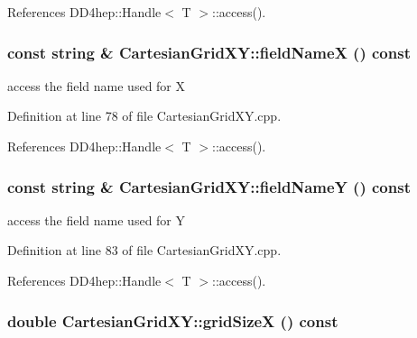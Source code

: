 References DD4hep::Handle$<$ T $>$::access().\hypertarget{class_d_d4hep_1_1_geometry_1_1_cartesian_grid_x_y_aa112adb69e3956f7a576f0de3267b499}{
\subsubsection[{fieldNameX}]{\setlength{\rightskip}{0pt plus 5cm}const {\bf string} \& CartesianGridXY::fieldNameX () const}}
\label{class_d_d4hep_1_1_geometry_1_1_cartesian_grid_x_y_aa112adb69e3956f7a576f0de3267b499}


access the field name used for X 

Definition at line 78 of file CartesianGridXY.cpp.

References DD4hep::Handle$<$ T $>$::access().\hypertarget{class_d_d4hep_1_1_geometry_1_1_cartesian_grid_x_y_a6599c502c4e9628911615308e4581f1c}{
\subsubsection[{fieldNameY}]{\setlength{\rightskip}{0pt plus 5cm}const {\bf string} \& CartesianGridXY::fieldNameY () const}}
\label{class_d_d4hep_1_1_geometry_1_1_cartesian_grid_x_y_a6599c502c4e9628911615308e4581f1c}


access the field name used for Y 

Definition at line 83 of file CartesianGridXY.cpp.

References DD4hep::Handle$<$ T $>$::access().\hypertarget{class_d_d4hep_1_1_geometry_1_1_cartesian_grid_x_y_ab5230ec655340600fd4dd452a4188a3c}{
\subsubsection[{gridSizeX}]{\setlength{\rightskip}{0pt plus 5cm}double CartesianGridXY::gridSizeX () const}}
\label{class_d_d4hep_1_1_geometry_1_1_cartesian_grid_x_y_ab5230ec655340600fd4dd452a4188a3c}


